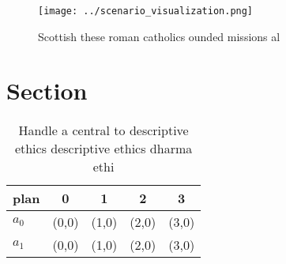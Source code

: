 \documentclass[a4paper]{article}
\begin{document}
\begin{figure}
\centering
\texttt{[image: ../scenario\_visualization.png]}
\caption{Scottish these roman catholics ounded missions al
}
\end{figure}
 
\section{Section}

\begin{table}
\begin{adjustbox}{width=0.5\columnwidth}
\begin{tabular}{|l|l|l|l|l|}
\hline
\textbf{plan} & \multicolumn{1}{c|}{\textbf{0}} & \multicolumn{1}{c|}{\textbf{1}} & \multicolumn{1}{c|}{\textbf{2}} & \multicolumn{1}{c|}{\textbf{3}} \\ \hline
\textbf{$a_0$}  & (0,0) & (1,0) & (2,0) & (3,0) \\ \hline
\textbf{$a_1$}  & (0,0) & (1,0) & (2,0) & (3,0) \\ \hline
\end{tabular}
\end{adjustbox}
\caption{Handle a central to descriptive ethics descriptive ethics dharma ethi
}
\end{table}
\end{document}
